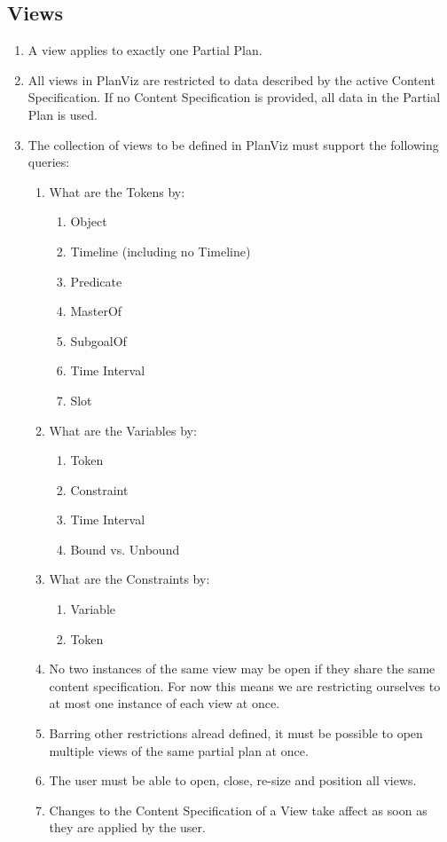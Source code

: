 \documentclass[twoside, 11pt]{article}
\begin{document}
\subsection{Views}
\begin{enumerate}
\item A view applies to exactly one Partial Plan.
\item All views in PlanViz are restricted to data described by the active Content Specification. If no Content Specification is provided, all data in the Partial Plan is used.
\item The collection of views to be defined in PlanViz must support the following queries:
\begin{enumerate}
\item What are the Tokens by:
\begin{enumerate}
\item Object
\item Timeline (including no Timeline)
\item Predicate
\item MasterOf
\item SubgoalOf
\item Time Interval
\item Slot
\end{enumerate}
\item What are the Variables by:
\begin{enumerate}
\item Token
\item Constraint
\item Time Interval
\item Bound vs. Unbound
\end{enumerate}
\item What are the Constraints by:
\begin{enumerate}
\item Variable
\item Token
\end{enumerate}
\item No two instances of the same view may be open if they share the same content specification. For now this means we are restricting ourselves to at most one instance of each view at once.
\item Barring other restrictions alread defined, it must be possible to open multiple views of the same partial plan at once.
\item The user must be able to open, close, re-size and position all views.
\item Changes to the Content Specification of a View take affect as soon as they are applied by the user.
\end{enumerate}
\end{enumerate}
\end{document}
